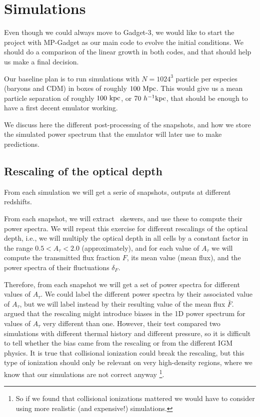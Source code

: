 \section{Simulations}
\label{sec:sims}

Even though we could always move to Gadget-3, we would like to start the 
project with MP-Gadget as our main code to evolve the initial conditions. 
We should do a comparison of the linear growth in both codes, and that should
help us make a final decision.

Our baseline plan is to run simulations with $N=1024^3$ particle per especies
(baryons and CDM) in boxes of roughly $100 \ \text{Mpc}$.
This would give us a mean particle separation of roughly $100 \ \text{kpc}$, or 
$70 \ h^{-1}\text{kpc}$, that should be enough to have a first decent emulator working.

We discuss here the different post-processing of the snapshots, and how we
store the simulated power spectrum that the emulator will later use to make
predictions.


\subsection{Rescaling of the optical depth}

From each simulation we will get a serie of snapshots, outputs at different
redshifts. 

From each snapshot, we will extract \lya\ skewers, and use these to compute
their power spectra.
We will repeat this exercise for different rescalings of the optical depth,
i.e., we will multiply the optical depth in all cells by a constant factor
in the range $0.5 < A_\tau < 2.0$ (approximately), and for each value of
$A_\tau$ we will compute the transmitted flux fraction $F$, its mean value
(mean flux), and the power spectra of their fluctuations $\delta_F$.

Therefore, from each snapshot we will get a set of power spectra for different
values of $A_\tau$.
We could label the different power spectra by their associated value of
$A_\tau$, but we will label instead by their resulting value of the mean
flux $\bar F$.
\cite{Lukic2015} argued that the rescaling might introduce biases in the
1D power spectrum for values of $A_\tau$ very different than one.
However, their test compared two simulations with different thermal history
and different pressure, so it is difficult to tell whether the bias came
from the rescaling or from the different IGM physics.
It is true that collisional ionization could break the rescaling, but this type
of ionization should only be relevant on very high-density regions,
where we know that our simulations are not correct anyway
\footnote{So if we found that collisional ionizations mattered we would
have to consider using more realistic (and expensive!) simulations.}.

